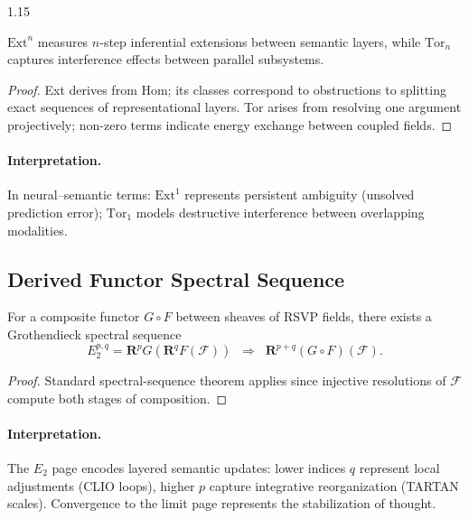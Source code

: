 \documentclass[12pt,a4paper]{article}
\begin{document}
\begin{spacing}{1.15}
\begin{proposition}
\label{prop:interpret}
\(\mathrm{Ext}^n\) measures \(n\)-step inferential extensions between semantic layers,
while \(\mathrm{Tor}_n\) captures interference effects between parallel subsystems.
\end{proposition}

\begin{proof}
Ext derives from Hom; its classes correspond to obstructions to splitting exact sequences of representational layers.
Tor arises from resolving one argument projectively;
non-zero terms indicate energy exchange between coupled fields.
\end{proof}

\paragraph{Interpretation.}
In neural–semantic terms:
\(\mathrm{Ext}^1\) represents persistent ambiguity (unsolved prediction error);
\(\mathrm{Tor}_1\) models destructive interference between overlapping modalities.

\subsection{Derived Functor Spectral Sequence}

\begin{theorem}
\label{thm:spectral}
For a composite functor \(G\circ F\)
between sheaves of RSVP fields,
there exists a Grothendieck spectral sequence
\[
  E_2^{p,q} = \mathbf{R}^pG(\mathbf{R}^qF(\mathscr{F}))
  \;\;\Rightarrow\;\;
  \mathbf{R}^{p+q}(G\!\circ\!F)(\mathscr{F}).
\]
\end{theorem}

\begin{proof}
Standard spectral-sequence theorem applies
since injective resolutions of \(\mathscr{F}\)
compute both stages of composition.
\end{proof}

\paragraph{Interpretation.}
The \(E_2\) page encodes layered semantic updates:
lower indices \(q\) represent local adjustments (CLIO loops),
higher \(p\) capture integrative reorganization (TARTAN scales).
Convergence to the limit page represents the stabilization of thought.


\end{spacing}
\end{document}
